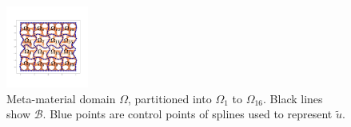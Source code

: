 \begin{figure}
\vspace{-1cm}
\centering
\includegraphics[height=2.7cm, trim={4.0cm 5cm 3.5cm 4.5cm}, clip]{lces/figures/decomp}
	\caption{\small Meta-material domain $\Omega$, partitioned into $\Omega_1$ to $\Omega_{16}$.
	Black lines show $\mathcal{B}$.
	Blue points are control points of splines used to represent $\tilde{u}$.\vspace{-.5cm}}
	\label{Fig:decomp}
\vspace{-.5cm}
\end{figure}
